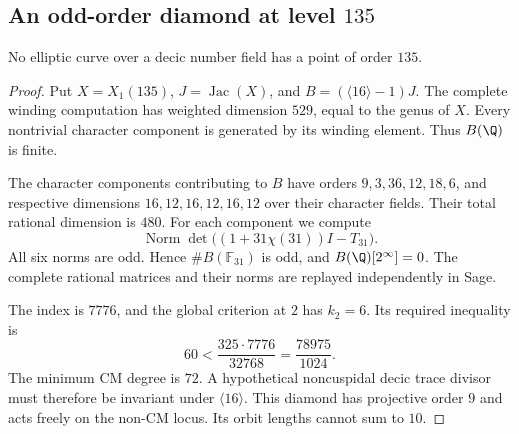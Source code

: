 \subsection{An odd-order diamond at level \texorpdfstring{$135$}{135}}
\begin{proposition}\label{prop:decic135}
No elliptic curve over a decic number field has a point of order $135$.
\end{proposition}
\begin{proof}
Put $X=X_1(135)$, $J=\operatorname{Jac}(X)$, and
$B=(\langle16\rangle-1)J$. The complete winding computation has
weighted dimension $529$, equal to the genus of $X$. Every nontrivial
character component is generated by its winding element. Thus
$B(\Q)$ is finite.

The character components contributing to $B$ have orders
$9,3,36,12,18,6$, and respective dimensions
$16,12,16,12,16,12$ over their character fields. Their total rational
dimension is $480$. For each component we compute
\[
 \operatorname{Norm}\det\bigl((1+31\chi(31))I-T_{31}\bigr).
\]
All six norms are odd. Hence $\#B(\mathbb F_{31})$ is odd, and
$B(\Q)[2^\infty]=0$. The complete rational matrices and their norms
are replayed independently in Sage.

The index is $7776$, and the global criterion at $2$ has $k_2=6$.
Its required inequality is
\[
 60<\frac{325\cdot7776}{32768}=\frac{78975}{1024}.
\]
The minimum CM degree is $72$. A hypothetical noncuspidal decic
trace divisor must therefore be invariant under $\langle16\rangle$.
This diamond has projective order $9$ and acts freely on the
non-CM locus. Its orbit lengths cannot sum to $10$.
\end{proof}

